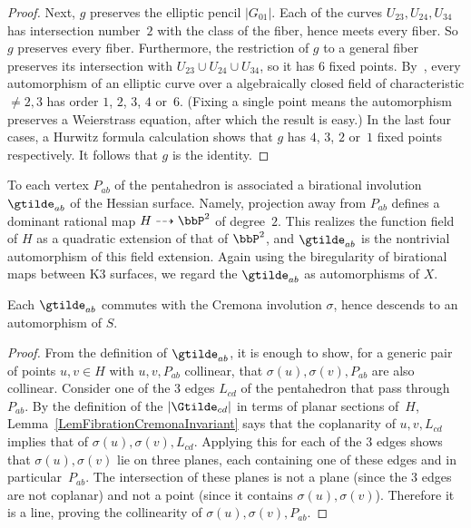 \begin{proof}
Next, $g$ preserves the elliptic pencil $|G_{01}|$. Each of the curves $U_{23},U_{24},U_{34}$ has intersection number~$2$ with the class of the fiber, hence meets every fiber. So $g$ preserves every fiber. Furthermore, the restriction of $g$ to a general fiber preserves its intersection with $U_{23}\cup U_{24}\cup U_{34}$, so it has 6 fixed points. By~\cite[Theorem~III.10.1]{Silverman}, every automorphism of an elliptic curve over a algebraically closed field of characteristic${}\ne 2,3$ has order $1$, $2$, $3$, $4$ or~$6$. (Fixing a single point means the automorphism preserves a Weierstrass equation, after which the result is easy.) In the last four cases, a Hurwitz formula calculation shows that $g$ has $4$, $3$, $2$ or~$1$ fixed points respectively. It follows that $g$ is the identity.
\end{proof}

To each vertex $P_{ab}$ of the pentahedron is associated a birational involution $\gtilde_{ab}$ of the Hessian surface. Namely, projection away from $P_{ab}$ defines a dominant rational map $H\dasharrow\bbP^2$ of degree~$2$. This realizes the function field of $H$ as a quadratic extension of that of $\bbP^2$, and $\gtilde_{ab}$ is the nontrivial automorphism of this field extension. Again using the biregularity of birational maps between K3 surfaces, we regard the $\gtilde_{ab}$ as automorphisms of $X$.

\begin{lemm}
Each $\gtilde_{ab}$ commutes with the Cremona involution $\sigma$, hence descends to an automorphism of $S$.
\end{lemm}

\begin{proof}
From the definition of $\gtilde_{ab}$, it is enough to show, for a generic pair of points $u,v\in H$ with $u,v,P_{ab}$ collinear, that $\sigma(u),\sigma(v),P_{ab}$ are also collinear. Consider one of the 3 edges $L_{cd}$ of the pentahedron that pass through~$P_{ab}$. By the definition of the $|\Gtilde_{cd}|$ in terms of planar sections of~$H$, Lemma~\ref{LemFibrationCremonaInvariant} says that the coplanarity of $u,v,L_{cd}$ implies that of $\sigma(u),\sigma(v),L_{cd}$. Applying this for each of the 3 edges shows that $\sigma(u),\sigma(v)$ lie on three planes, each containing one of these edges and in particular~$P_{ab}$. The intersection of these planes is not a plane (since the 3 edges are not coplanar) and not a point (since it contains $\sigma(u),\sigma(v)$). Therefore it is a line, proving the collinearity of $\sigma(u),\sigma(v),P_{ab}$.
\end{proof}

